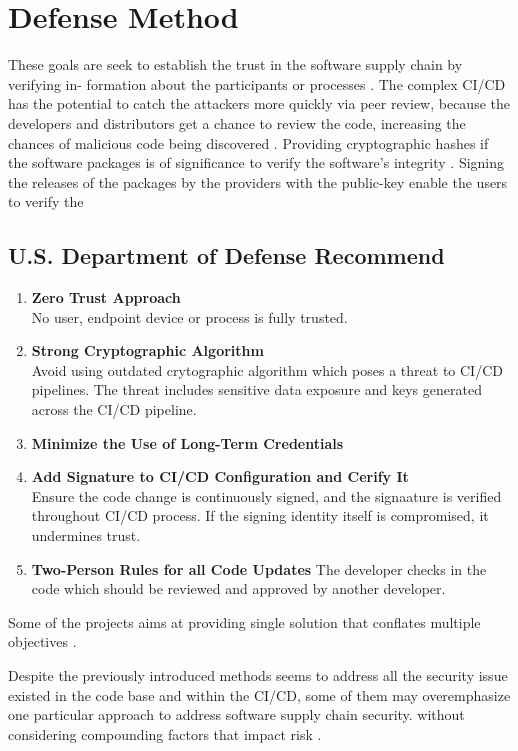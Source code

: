\section{Defense Method}

These goals are seek to establish the trust in the software supply chain by verifying in-
formation about the participants or processes \cite{melara2022software}.
The complex CI/CD has the potential to catch the attackers more quickly via peer review, 
because the developers and distributors get a chance to review the code, increasing
the chances of malicious code being discovered \cite{levy2003poisoning}.
Providing cryptographic hashes if the software packages is of significance to
verify the software's integrity \cite{levy2003poisoning}.
Signing the releases of the packages by the providers with the public-key enable the 
users to verify the 
\subsection{ U.S. Department of Defense Recommend \cite{DoDDefCI/CD2023}}
\begin{enumerate}
    \item \textbf{Zero Trust Approach} \\
        No user, endpoint device or process is fully trusted.
    \item \textbf{Strong Cryptographic Algorithm} \\
        Avoid using outdated crytographic algorithm which poses a threat to CI/CD pipelines.
        The threat includes sensitive data exposure and keys generated across the CI/CD 
        pipeline. 
    \item \textbf{Minimize the Use of Long-Term Credentials}
    \item \textbf{Add Signature to CI/CD Configuration and Cerify It} \\
        Ensure the code change is continuously signed, and the signaature is verified throughout
        CI/CD process. If the signing identity itself is compromised, it undermines trust.
    \item \textbf{Two-Person Rules for all Code Updates}    
        The developer checks in the code which should be reviewed and approved by another 
        developer. 

\end{enumerate}
Some of the projects aims at providing single solution that conﬂates multiple objectives 
\cite{melara2022software}.

Despite the previously introduced methods seems to address all the security issue
existed in the code base and within the CI/CD, some of them may overemphasize one 
particular approach to address software supply chain security. without considering 
compounding factors that impact risk \cite{melara2022software}.